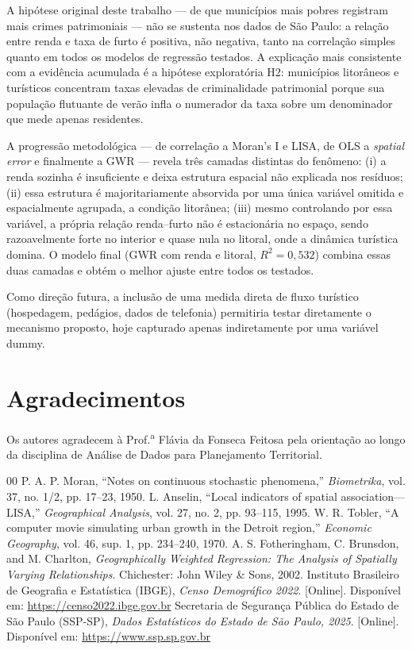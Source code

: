 \documentclass[conference]{IEEEtran}
\begin{document}
A hipótese original deste trabalho --- de que municípios mais pobres
registram mais crimes patrimoniais --- não se sustenta nos dados de São
Paulo: a relação entre renda e taxa de furto é positiva, não negativa, tanto
na correlação simples quanto em todos os modelos de regressão testados. A
explicação mais consistente com a evidência acumulada é a hipótese
exploratória H2: municípios litorâneos e turísticos concentram taxas
elevadas de criminalidade patrimonial porque sua população flutuante de
verão infla o numerador da taxa sobre um denominador que mede apenas
residentes.

A progressão metodológica --- de correlação a Moran's I e LISA, de OLS a
\textit{spatial error} e finalmente a GWR --- revela três camadas distintas
do fenômeno: (i) a renda sozinha é insuficiente e deixa estrutura espacial
não explicada nos resíduos; (ii) essa estrutura é majoritariamente absorvida
por uma única variável omitida e espacialmente agrupada, a condição
litorânea; (iii) mesmo controlando por essa variável, a própria relação
renda--furto não é estacionária no espaço, sendo razoavelmente forte no
interior e quase nula no litoral, onde a dinâmica turística domina. O modelo
final (GWR com renda e litoral, $R^2 = 0{,}532$) combina essas duas camadas
e obtém o melhor ajuste entre todos os testados.

Como direção futura, a inclusão de uma medida direta de fluxo turístico
(hospedagem, pedágios, dados de telefonia) permitiria testar diretamente o
mecanismo proposto, hoje capturado apenas indiretamente por uma variável
dummy.

\section*{Agradecimentos}
Os autores agradecem à Prof.\textsuperscript{a} Flávia da Fonseca Feitosa
pela orientação ao longo da disciplina de Análise de Dados para
Planejamento Territorial.

\begin{thebibliography}{00}
 P. A. P. Moran, ``Notes on continuous stochastic
phenomena,'' \textit{Biometrika}, vol. 37, no. 1/2, pp. 17--23, 1950.
 L. Anselin, ``Local indicators of spatial
association---LISA,'' \textit{Geographical Analysis}, vol. 27, no. 2,
pp. 93--115, 1995.
 W. R. Tobler, ``A computer movie simulating urban
growth in the Detroit region,'' \textit{Economic Geography}, vol. 46,
sup. 1, pp. 234--240, 1970.
 A. S. Fotheringham, C. Brunsdon, and M.
Charlton, \textit{Geographically Weighted Regression: The Analysis of
Spatially Varying Relationships}. Chichester: John Wiley \& Sons, 2002.
 Instituto Brasileiro de Geografia e Estatística (IBGE),
\textit{Censo Demográfico 2022}. [Online]. Disponível em:
\url{https://censo2022.ibge.gov.br}
 Secretaria de Segurança Pública do Estado de São Paulo
(SSP-SP), \textit{Dados Estatísticos do Estado de São Paulo, 2025}.
[Online]. Disponível em: \url{https://www.ssp.sp.gov.br}
\end{thebibliography}
\end{document}
